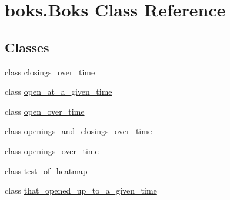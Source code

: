 \hypertarget{classboks_1_1Boks}{}\section{boks.\+Boks Class Reference}
\label{classboks_1_1Boks}
\subsection*{Classes}
\begin{DoxyCompactItemize}
\item 
class \mbox{\hyperlink{classboks_1_1Boks_1_1closings__over__time}{closings\+\_\+over\+\_\+time}}
\item 
class \mbox{\hyperlink{classboks_1_1Boks_1_1open__at__a__given__time}{open\+\_\+at\+\_\+a\+\_\+given\+\_\+time}}
\item 
class \mbox{\hyperlink{classboks_1_1Boks_1_1open__over__time}{open\+\_\+over\+\_\+time}}
\item 
class \mbox{\hyperlink{classboks_1_1Boks_1_1openings__and__closings__over__time}{openings\+\_\+and\+\_\+closings\+\_\+over\+\_\+time}}
\item 
class \mbox{\hyperlink{classboks_1_1Boks_1_1openings__over__time}{openings\+\_\+over\+\_\+time}}
\item 
class \mbox{\hyperlink{classboks_1_1Boks_1_1test__of__heatmap}{test\+\_\+of\+\_\+heatmap}}
\item 
class \mbox{\hyperlink{classboks_1_1Boks_1_1that__opened__up__to__a__given__time}{that\+\_\+opened\+\_\+up\+\_\+to\+\_\+a\+\_\+given\+\_\+time}}
\end{DoxyCompactItemize}
